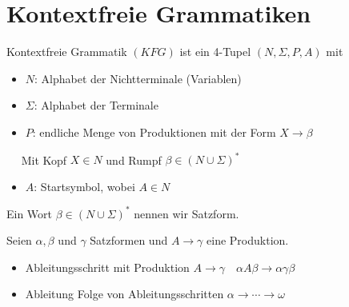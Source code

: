 \graphicspath{{images/}}
\section*{Kontextfreie Grammatiken}

\begin{definition}{Kontextfreie Grammatik} $(K F G)$ ist ein 4-Tupel $(N, \Sigma, P, A)$ mit
    \begin{itemize}
    \item $N$: Alphabet der Nichtterminale (Variablen)
    \item $\Sigma$: Alphabet der Terminale
    \item $P$: endliche Menge von Produktionen mit der Form $X \rightarrow \beta$
    \end{itemize}

    $\quad$ Mit Kopf $X \in N$ und Rumpf $\beta \in(N \cup \Sigma)^{*}$

    \begin{itemize}
    \item $A$: Startsymbol, wobei $A \in N$
    \end{itemize}

    Ein Wort $\beta \in(N \cup \Sigma)^{*}$ nennen wir Satzform.

    Seien $\alpha, \beta$ und $\gamma$ Satzformen und $A \rightarrow \gamma$ eine Produktion.

    \begin{itemize}
    \item Ableitungsschritt mit Produktion $A \rightarrow \gamma \quad \alpha A \beta \rightarrow \alpha \gamma \beta$
    \item Ableitung Folge von Ableitungsschritten $\alpha \rightarrow \cdots \rightarrow \omega$
    \end{itemize}
\end{definition}

